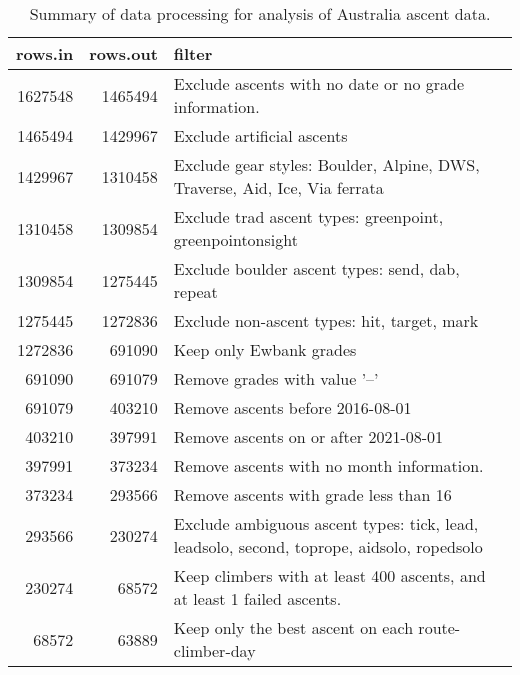 \begin{table}[ht]
\centering
\begingroup\fontsize{9pt}{10pt}\selectfont
\begin{tabular}{rrl}
  \hline
{\bf rows.in} & {\bf rows.out} & {\bf filter} \\ 
  \hline
1627548 & 1465494 & Exclude ascents with no date or no grade information. \\ 
  1465494 & 1429967 & Exclude artificial ascents \\ 
  1429967 & 1310458 & Exclude gear styles: Boulder, Alpine, DWS, Traverse, Aid, Ice, Via ferrata \\ 
  1310458 & 1309854 & Exclude trad ascent types: greenpoint, greenpointonsight \\ 
  1309854 & 1275445 & Exclude boulder ascent types: send, dab, repeat \\ 
  1275445 & 1272836 & Exclude non-ascent types: hit, target, mark \\ 
  1272836 & 691090 & Keep only Ewbank grades \\ 
  691090 & 691079 & Remove grades with value '--' \\ 
  691079 & 403210 & Remove ascents before 2016-08-01 \\ 
  403210 & 397991 & Remove ascents on or after 2021-08-01 \\ 
  397991 & 373234 & Remove ascents with no month information. \\ 
  373234 & 293566 & Remove ascents with grade less than 16 \\ 
  293566 & 230274 & Exclude ambiguous ascent types: tick, lead, leadsolo, second, toprope, aidsolo, ropedsolo \\ 
  230274 & 68572 & Keep climbers with at least 400 ascents, and at least 1 failed ascents. \\ 
  68572 & 63889 & Keep only the best ascent on each route-climber-day \\ 
   \hline
\end{tabular}
\endgroup
\caption{Summary of data processing for analysis of Australia ascent data.} 
\label{table-data-processing-aus}
\end{table}
